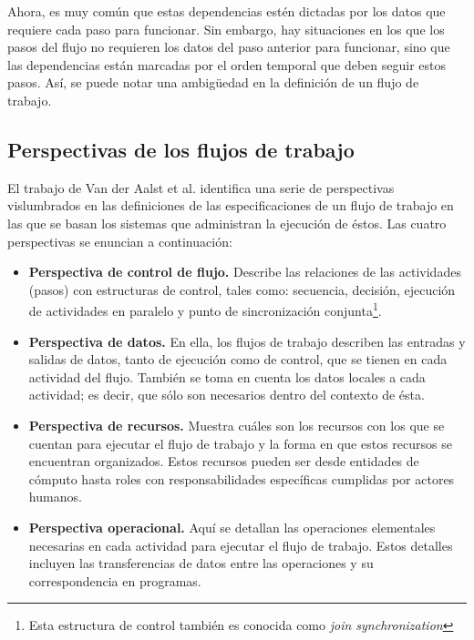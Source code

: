 \documentclass[letterpaper, 12pt]{report}
\begin{document}
Ahora, es muy común que estas dependencias estén dictadas por los datos que requiere cada paso para funcionar. Sin embargo, hay situaciones en los que los pasos del flujo no requieren los datos del paso anterior para funcionar, sino que las dependencias están marcadas por el orden temporal que deben seguir estos pasos. Así, se puede notar una ambigüedad en la definición de un flujo de trabajo.

\subsection{Perspectivas de los flujos de trabajo}
El trabajo de Van der Aalst et al. \cite{van2003workflow} identifica una serie de perspectivas vislumbrados en las definiciones de las especificaciones de un flujo de trabajo en las que se basan los sistemas que administran la ejecución de éstos. Las cuatro perspectivas se enuncian a continuación:

\begin{itemize}

\item{\textbf{Perspectiva de control de flujo.} Describe las relaciones de las actividades (pasos) con estructuras de control, tales como: secuencia, decisión, ejecución de actividades en paralelo y punto de sincronización conjunta\footnote{Esta estructura de control también es conocida como \emph{join synchronization}}.}

\item{\textbf{Perspectiva de datos.} En ella, los flujos de trabajo describen las entradas y salidas de datos, tanto de ejecución como de control, que se tienen en cada actividad del flujo. También se toma en cuenta los datos locales a cada actividad; es decir, que sólo son necesarios dentro del contexto de ésta.}

\item{\textbf{Perspectiva de recursos.} Muestra cuáles son los recursos con los que se cuentan para ejecutar el flujo de trabajo y la forma en que estos recursos se encuentran organizados. Estos recursos pueden ser desde entidades de cómputo hasta roles con responsabilidades específicas cumplidas por actores humanos.}

\item{\textbf{Perspectiva operacional.} Aquí se detallan las operaciones elementales necesarias en cada actividad para ejecutar el flujo de trabajo. Estos detalles incluyen las transferencias de datos entre las operaciones y su correspondencia en programas.}

\end{itemize}
\end{document}
